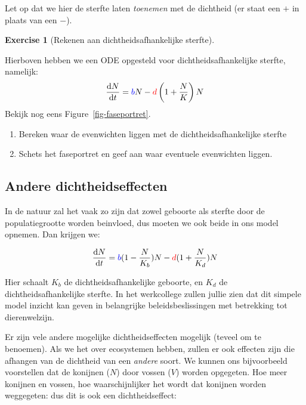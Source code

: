 \documentclass[
  letterpaper,
  DIV=11,
  numbers=noendperiod]{scrartcl}
\providecommand{\tightlist}{%
  \setlength{\itemsep}{0pt}\setlength{\parskip}{0pt}}\usepackage{longtable,booktabs,array}
\theoremstyle{definition}
\newtheorem{exercise}{Exercise}[section]
\theoremstyle{remark}
\begin{document}
Let op dat we hier de sterfte laten \emph{toenemen} met de dichtheid (er
staat een \(+\) in plaats van een \(-\)).

\begin{exercise}[Rekenen aan dichtheidsafhankelijke
sterfte]\protect\hypertarget{exr-dddportrait}{}\label{exr-dddportrait}

Hierboven hebben we een ODE opgesteld voor dichtheidsafhankelijke
sterfte, namelijk: \[
\frac{\mathrm{d}N}{\mathrm{d}t} = \color{blue}b\color{black}N - \color{red}d\color{black} \left( 1+\frac{N}{K}\right)N
\] Bekijk nog eens Figure~\ref{fig-faseportret}.

\begin{enumerate}
\def\labelenumi{\alph{enumi}.}
\tightlist
\item
  Bereken waar de evenwichten liggen met de dichtheidsafhankelijke
  sterfte
\item
  Schets het faseportret en geef aan waar eventuele evenwichten liggen.
\end{enumerate}

\end{exercise}

\subsection{Andere dichtheidseffecten}\label{andere-dichtheidseffecten}

In de natuur zal het vaak zo zijn dat zowel geboorte als sterfte door de
populatiegrootte worden beinvloed, dus moeten we ook beide in ons model
opnemen. Dan krijgen we:

\begin{align}
    \frac{\mathrm{d}N}{\mathrm{d}t} &= \color{blue}b\color{black}(1-\frac{N}{K_b})N - \color{red}d\color{black}(1+\frac{N}{K_d})N\\
\end{align}

Hier schaalt \(K_b\) de dichtheidsafhankelijke geboorte, en \(K_d\) de
dichtheidsafhankelijke sterfte. In het werkcollege zullen jullie zien
dat dit simpele model inzicht kan geven in belangrijke
beleidsbeslissingen met betrekking tot dierenwelzijn.

Er zijn vele andere mogelijke dichtheidseffecten mogelijk (teveel om te
benoemen). Als we het over ecosystemen hebben, zullen er ook effecten
zijn die afhangen van de dichtheid van een \emph{andere} soort. We
kunnen ons bijvoorbeeld voorstellen dat de konijnen (\(N\)) door vossen
(\(V\)) worden opgegeten. Hoe meer konijnen en vossen, hoe
waarschijnlijker het wordt dat konijnen worden weggegeten: dus dit is
ook een dichtheidseffect:
\end{document}
